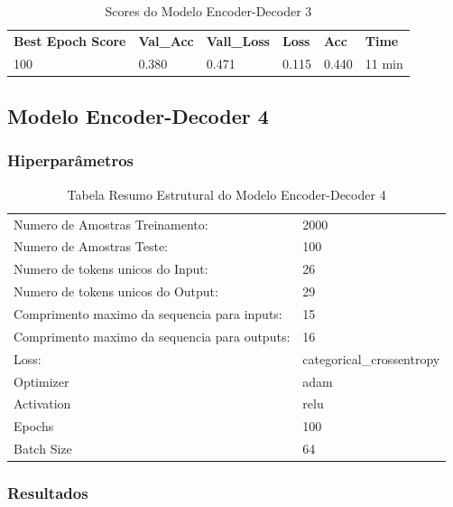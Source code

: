 \begin{table}[H]
\centering
\begin{tabular}{llllll}
\textbf{Best Epoch Score} & \textbf{Val\_Acc} & \textbf{Vall\_Loss} & \textbf{Loss} & \textbf{Acc} & \textbf{Time} \\
100 & 0.380 & 0.471 & 0.115 & 0.440 & 11 min
\end{tabular}
\caption{Scores do Modelo Encoder-Decoder 3}
\label{tab:res-enc-dec-3}
\end{table}

\subsection{Modelo Encoder-Decoder 4}

\subsubsection{Hiperparâmetros} 

\begin{table}[H]
\centering
\begin{tabular}{ll}
Numero de Amostras Treinamento: & 2000 \\
Numero de Amostras Teste: & 100 \\
Numero de tokens unicos do Input: & 26 \\
Numero de tokens unicos do Output: & 29 \\
Comprimento maximo da sequencia para inputs: & 15 \\
Comprimento maximo da sequencia para outputs: & 16 \\
Loss: & categorical\_crossentropy \\
Optimizer & adam \\
Activation & relu \\
Epochs & 100 \\
Batch Size & 64
\end{tabular}
\caption{Tabela Resumo Estrutural do Modelo Encoder-Decoder 4}
\label{tab:res4}
\end{table}

\subsubsection{Resultados}

